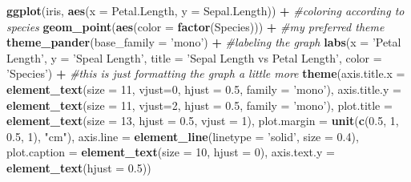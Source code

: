 \documentclass[
]{article}
\newenvironment{Shaded}{\begin{snugshade}}{\end{snugshade}}
\newcommand{\CommentTok}[1]{\textcolor[rgb]{0.56,0.35,0.01}{\textit{#1}}}
\newcommand{\DataTypeTok}[1]{\textcolor[rgb]{0.13,0.29,0.53}{#1}}
\newcommand{\DecValTok}[1]{\textcolor[rgb]{0.00,0.00,0.81}{#1}}
\newcommand{\FloatTok}[1]{\textcolor[rgb]{0.00,0.00,0.81}{#1}}
\newcommand{\KeywordTok}[1]{\textcolor[rgb]{0.13,0.29,0.53}{\textbf{#1}}}
\newcommand{\NormalTok}[1]{#1}
\newcommand{\OperatorTok}[1]{\textcolor[rgb]{0.81,0.36,0.00}{\textbf{#1}}}
\newcommand{\StringTok}[1]{\textcolor[rgb]{0.31,0.60,0.02}{#1}}
\begin{document}
\begin{Shaded}
\begin{Highlighting}[]
\KeywordTok{ggplot}\NormalTok{(iris, }\KeywordTok{aes}\NormalTok{(}\DataTypeTok{x =}\NormalTok{ Petal.Length, }\DataTypeTok{y =}\NormalTok{ Sepal.Length)) }\OperatorTok{+}
\StringTok{     }
\StringTok{  }\CommentTok{#coloring according to species }
\StringTok{  }\KeywordTok{geom_point}\NormalTok{(}\KeywordTok{aes}\NormalTok{(}\DataTypeTok{color =} \KeywordTok{factor}\NormalTok{(Species))) }\OperatorTok{+}\StringTok{ }
\StringTok{      }
\StringTok{  }\CommentTok{#my preferred theme}
\StringTok{  }\KeywordTok{theme_pander}\NormalTok{(}\DataTypeTok{base_family =} \StringTok{'mono'}\NormalTok{) }\OperatorTok{+}\StringTok{ }
\StringTok{  }
\StringTok{  }\CommentTok{#labeling the graph}
\StringTok{  }\KeywordTok{labs}\NormalTok{(}\DataTypeTok{x =} \StringTok{'Petal Length'}\NormalTok{, }\DataTypeTok{y =} \StringTok{'Speal Length'}\NormalTok{,}
           \DataTypeTok{title =} \StringTok{'Sepal Length vs Petal Length'}\NormalTok{, }
           \DataTypeTok{color =} \StringTok{'Species'}\NormalTok{) }\OperatorTok{+}\StringTok{ }
\StringTok{  }
\StringTok{  }\CommentTok{#this is just formatting the graph a little more}
\StringTok{  }\KeywordTok{theme}\NormalTok{(}\DataTypeTok{axis.title.x =} \KeywordTok{element_text}\NormalTok{(}\DataTypeTok{size =} \DecValTok{11}\NormalTok{, }\DataTypeTok{vjust=}\DecValTok{0}\NormalTok{, }\DataTypeTok{hjust =} \FloatTok{0.5}\NormalTok{, }\DataTypeTok{family =} \StringTok{'mono'}\NormalTok{), }
        \DataTypeTok{axis.title.y =} \KeywordTok{element_text}\NormalTok{(}\DataTypeTok{size =} \DecValTok{11}\NormalTok{, }\DataTypeTok{vjust=}\DecValTok{2}\NormalTok{, }\DataTypeTok{hjust =} \FloatTok{0.5}\NormalTok{, }\DataTypeTok{family =} \StringTok{'mono'}\NormalTok{),}
        \DataTypeTok{plot.title =} \KeywordTok{element_text}\NormalTok{(}\DataTypeTok{size =} \DecValTok{13}\NormalTok{, }\DataTypeTok{hjust =} \FloatTok{0.5}\NormalTok{, }\DataTypeTok{vjust =} \DecValTok{1}\NormalTok{),}
        \DataTypeTok{plot.margin =} \KeywordTok{unit}\NormalTok{(}\KeywordTok{c}\NormalTok{(}\FloatTok{0.5}\NormalTok{, }\DecValTok{1}\NormalTok{, }\FloatTok{0.5}\NormalTok{, }\DecValTok{1}\NormalTok{), }\StringTok{"cm"}\NormalTok{),}
        \DataTypeTok{axis.line =} \KeywordTok{element_line}\NormalTok{(}\DataTypeTok{linetype =} \StringTok{'solid'}\NormalTok{, }\DataTypeTok{size =} \FloatTok{0.4}\NormalTok{),}
        \DataTypeTok{plot.caption =} \KeywordTok{element_text}\NormalTok{(}\DataTypeTok{size =} \DecValTok{10}\NormalTok{, }\DataTypeTok{hjust =} \DecValTok{0}\NormalTok{),}
        \DataTypeTok{axis.text.y =} \KeywordTok{element_text}\NormalTok{(}\DataTypeTok{hjust =} \FloatTok{0.5}\NormalTok{)) }
\end{Highlighting}
\end{Shaded}
\end{document}
